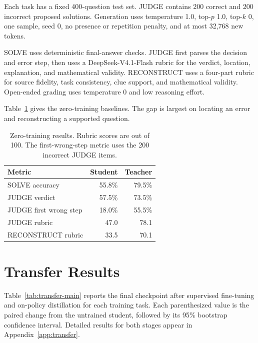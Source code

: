\documentclass[11pt]{article}
\begin{document}
Each task has a fixed 400-question test set. JUDGE contains 200 correct and 200 incorrect proposed solutions. Generation uses temperature 1.0, top-$p$ 1.0, top-$k$ 0, one sample, seed 0, no presence or repetition penalty, and at most 32,768 new tokens.

SOLVE uses deterministic final-answer checks. JUDGE first parses the decision and error step, then uses a DeepSeek-V4.1-Flash rubric for the verdict, location, explanation, and mathematical validity. RECONSTRUCT uses a four-part rubric for source fidelity, task consistency, clue support, and mathematical validity. Open-ended grading uses temperature 0 and low reasoning effort.

Table~\ref{tab:baseline} gives the zero-training baselines. The gap is largest on locating an error and reconstructing a supported question.

\begin{table}[t]
\centering
\small
\setlength{\tabcolsep}{4pt}
\begin{tabular}{lrr}
\toprule
Metric & Student & Teacher \\
\midrule
SOLVE accuracy & 55.8\% & 79.5\% \\
JUDGE verdict & 57.5\% & 73.5\% \\
JUDGE first wrong step & 18.0\% & 55.5\% \\
JUDGE rubric & 47.0 & 78.1 \\
RECONSTRUCT rubric & 33.5 & 70.1 \\
\bottomrule
\end{tabular}
\caption{Zero-training results. Rubric scores are out of 100. The first-wrong-step metric uses the 200 incorrect JUDGE items.}
\label{tab:baseline}
\end{table}

\section{Transfer Results}

Table~\ref{tab:transfer-main} reports the final checkpoint after supervised fine-tuning and on-policy distillation for each training task. Each parenthesized value is the paired change from the untrained student, followed by its 95\% bootstrap confidence interval. Detailed results for both stages appear in Appendix~\ref{app:transfer}.
\end{document}
